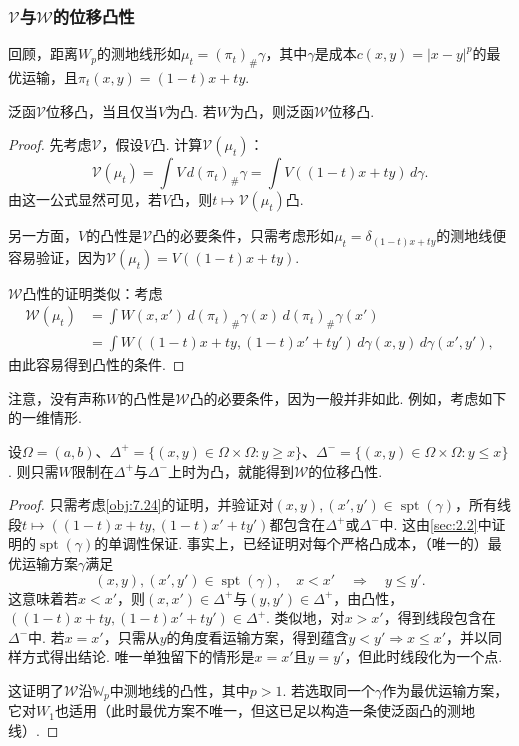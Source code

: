 \subsubsection[势能与相互作用能的位移凸性]{$\mathscr V$与$\mathscr W$的位移凸性}\label{sec:7.3.1}
\label{idx:i43-p270}
\label{idx:i66-p270}
回顾，距离$W_p$的测地线形如$\mu_t=(\pi_t)_\#\gamma$，其中$\gamma$是成本$c(x,y)=|x-y|^p$的最优运输，且$\pi_t(x,y)=(1-t)x+ty$.
\begin{proposition}\label{obj:7.24}
泛函$\mathscr V$位移凸，当且仅当$V$为凸. 若$W$为凸，则泛函$\mathscr W$位移凸.
\end{proposition}
\begin{proof}
先考虑$\mathscr V$，假设$V$凸. 计算$\mathscr V(\mu_t)$：
\[
 \mathscr V(\mu_t)=\int V\,d(\pi_t)_\#\gamma
                 =\int V((1-t)x+ty)\,d\gamma.
\]
由这一公式显然可见，若$V$凸，则$t\mapsto\mathscr V(\mu_t)$凸.

另一方面，$V$的凸性是$\mathscr V$凸的必要条件，只需考虑形如$\mu_t=\delta_{(1-t)x+ty}$的测地线便容易验证，因为$\mathscr V(\mu_t)=V((1-t)x+ty)$.

$\mathscr W$凸性的证明类似：考虑
\[
\begin{aligned}
 \mathscr W(\mu_t)&=\int W(x,x')\,d(\pi_t)_\#\gamma(x)\,d(\pi_t)_\#\gamma(x')\\
 &=\int W((1-t)x+ty,(1-t)x'+ty')\,d\gamma(x,y)\,d\gamma(x',y'),
\end{aligned}
\]
由此容易得到凸性的条件.
\end{proof}
注意，没有声称$W$的凸性是$\mathscr W$凸的必要条件，因为一般并非如此. 例如，考虑如下的一维情形.
\begin{proposition}\label{obj:7.25}
设$\Omega=(a,b)$、$\Delta^+=\{(x,y)\in\Omega\times\Omega:y\geq x\}$、$\Delta^-=\{(x,y)\in\Omega\times\Omega:y\leq x\}$. 则只需$W$限制在$\Delta^+$与$\Delta^-$上时为凸，就能得到$\mathscr W$的位移凸性.
\end{proposition}
\begin{proof}
只需考虑\autoref{obj:7.24}的证明，并验证对$(x,y),(x',y')\in\operatorname{spt}(\gamma)$，所有线段$t\mapsto((1-t)x+ty,(1-t)x'+ty')$都包含在$\Delta^+$或$\Delta^-$中. 这由\autoref{sec:2.2}中证明的$\operatorname{spt}(\gamma)$的单调性保证. 事实上，已经证明对每个严格凸成本，（唯一的）最优运输方案$\gamma$满足
\[
 (x,y),(x',y')\in\operatorname{spt}(\gamma),\quad x<x'
                      \quad\Longrightarrow\quad y\leq y'.
\]
这意味着若$x<x'$，则$(x,x')\in\Delta^+$与$(y,y')\in\Delta^+$，由凸性，$((1-t)x+ty,(1-t)x'+ty')\in\Delta^+$. 类似地，对$x>x'$，得到线段包含在$\Delta^-$中. 若$x=x'$，只需从$y$的角度看运输方案，得到蕴含$y<y'\Longrightarrow x\leq x'$，并以同样方式得出结论. 唯一单独留下的情形是$x=x'$且$y=y'$，但此时线段化为一个点.

这证明了$\mathscr W$沿$\mathbb W_p$中测地线的凸性，其中$p>1$. 若选取同一个$\gamma$作为最优运输方案，它对$W_1$也适用（此时最优方案不唯一，但这已足以构造一条使泛函凸的测地线）.
\end{proof}
